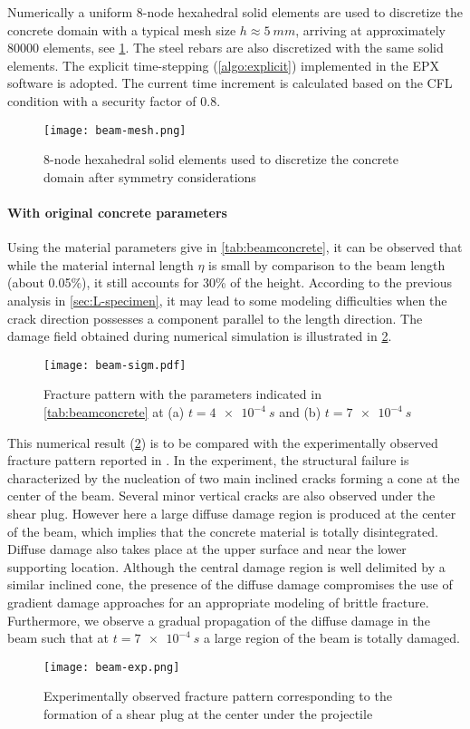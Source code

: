 Numerically a uniform 8-node hexahedral solid elements are used to discretize the concrete domain with a typical mesh size $h\approx\SI{5}{mm}$, arriving at approximately \num{80000} elements, see \cref{fig:beammesh}. The steel rebars are also discretized with the same solid elements. The explicit time-stepping (\cref{algo:explicit}) implemented in the EPX software is adopted. The current time increment is calculated based on the CFL condition with a security factor of 0.8.
\begin{figure}[htbp]
\centering
\texttt{[image: beam-mesh.png]}
\caption{8-node hexahedral solid elements used to discretize the concrete domain after symmetry considerations} \label{fig:beammesh}
\end{figure}

\paragraph{With original concrete parameters} Using the material parameters give in \cref{tab:beamconcrete}, it can be observed that while the material internal length $\eta$ is small by comparison to the beam length (about 0.05\%), it still accounts for 30\% of the height. According to the previous analysis in \cref{sec:L-specimen}, it may lead to some modeling difficulties when the crack direction possesses a component parallel to the length direction. The damage field obtained during numerical simulation is illustrated in \cref{fig:beamsigm}.
\begin{figure}[htbp]
\centering
\texttt{[image: beam-sigm.pdf]}
\caption{Fracture pattern with the parameters indicated in \cref{tab:beamconcrete} at (a) $t=\SI{4e-4}{s}$ and (b) $t=\SI{7e-4}{s}$} \label{fig:beamsigm}
\end{figure}

This numerical result (\cref{fig:beamsigm}) is to be compared with the experimentally observed fracture pattern reported in \cite{Guilbaud:2015}. In the experiment, the structural failure is characterized by the nucleation of two main inclined cracks forming a cone at the center of the beam. Several minor vertical cracks are also observed under the shear plug. However here a large diffuse damage region is produced at the center of the beam, which implies that the concrete material is totally disintegrated. Diffuse damage also takes place at the upper surface and near the lower supporting location. Although the central damage region is well delimited by a similar inclined cone, the presence of the diffuse damage compromises the use of gradient damage approaches for an appropriate modeling of brittle fracture. Furthermore, we observe a gradual propagation of the diffuse damage in the beam such that at $t=\SI{7e-4}{s}$ a large region of the beam is totally damaged.
\begin{figure}[htbp]
\centering
\texttt{[image: beam-exp.png]}
\caption{Experimentally observed fracture pattern corresponding to the formation of a shear plug at the center under the projectile} \label{fig:beamexp}
\end{figure}

